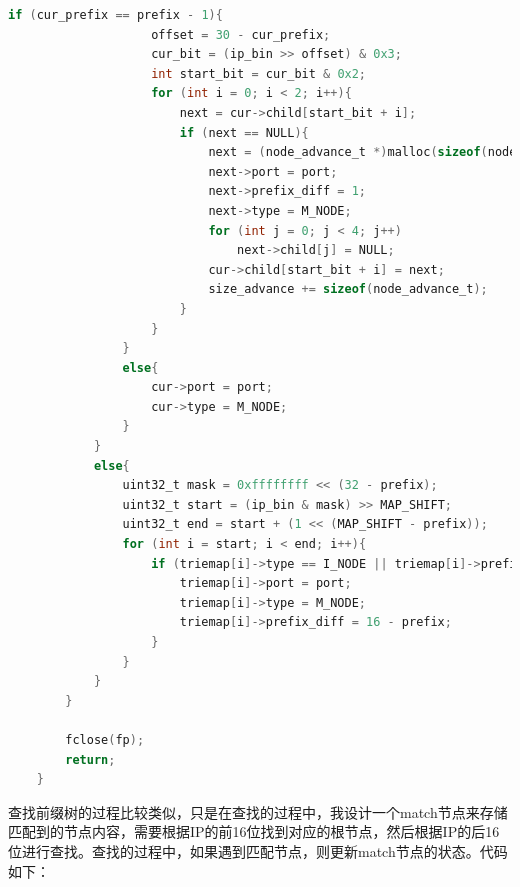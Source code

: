 \documentclass[UTF8]{report}
\begin{document}
\begin{lstlisting}[language=C]
                if (cur_prefix == prefix - 1){
                    offset = 30 - cur_prefix;
                    cur_bit = (ip_bin >> offset) & 0x3;
                    int start_bit = cur_bit & 0x2;
                    for (int i = 0; i < 2; i++){
                        next = cur->child[start_bit + i];
                        if (next == NULL){
                            next = (node_advance_t *)malloc(sizeof(node_advance_t));
                            next->port = port;
                            next->prefix_diff = 1;
                            next->type = M_NODE;
                            for (int j = 0; j < 4; j++)
                                next->child[j] = NULL;
                            cur->child[start_bit + i] = next;
                            size_advance += sizeof(node_advance_t);
                        }
                    }
                }
                else{
                    cur->port = port;
                    cur->type = M_NODE;
                }
            }
            else{
                uint32_t mask = 0xffffffff << (32 - prefix);
                uint32_t start = (ip_bin & mask) >> MAP_SHIFT;
                uint32_t end = start + (1 << (MAP_SHIFT - prefix));
                for (int i = start; i < end; i++){
                    if (triemap[i]->type == I_NODE || triemap[i]->prefix_diff >= 16 - prefix){
                        triemap[i]->port = port;
                        triemap[i]->type = M_NODE;
                        triemap[i]->prefix_diff = 16 - prefix;
                    }
                }
            }
        }   
            
        fclose(fp);
        return;
    }    
\end{lstlisting}

查找前缀树的过程比较类似，只是在查找的过程中，我设计一个match节点来存储匹配到的节点内容，需要根据IP的前16位找到对应的根节点，然后根据IP的后16位进行查找。查找的过程中，如果遇到匹配节点，则更新match节点的状态。代码如下：
\end{document}
